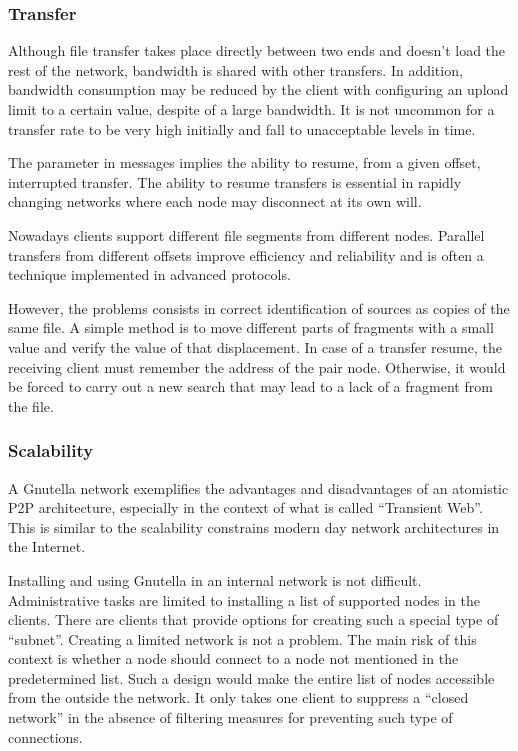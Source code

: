\subsubsection{Transfer}

Although file transfer takes place directly between two ends and doesn't
load the rest of the network, bandwidth is shared with other transfers. In
addition, bandwidth consumption may be reduced by the client with configuring
an upload limit to a certain value, despite of a large bandwidth. It is not
uncommon for a transfer rate to be very high initially and fall to
unacceptable levels in time.

The parameter in messages implies the ability to resume, from a given offset,
interrupted transfer. The ability to resume transfers is essential in rapidly
changing networks where each node may disconnect at its own will.

Nowadays clients support different file segments from different nodes.
Parallel transfers from different offsets improve efficiency and reliability
and is often a technique implemented in advanced protocols.

However, the problems consists in correct identification of sources as copies
of the same file. A simple method is to move different parts of fragments with
a small value and verify the value of that displacement. In case of a transfer
resume, the receiving client must remember the address of the pair node.
Otherwise, it would be forced to carry out a new search that may lead to
a lack of a fragment from the file.

\subsubsection{Scalability}

A Gnutella network exemplifies the advantages and disadvantages of an atomistic
P2P architecture, especially in the context of what is called ``Transient Web''.
This is similar to the scalability constrains modern day network
architectures in the Internet.

Installing and using Gnutella in an internal network is not difficult.
Administrative tasks are limited to installing a list of supported nodes in
the clients. There are clients that provide options for creating such a
special type of ``subnet''. Creating a limited network is not a problem. The
main risk of this context is whether a node should connect to a node not
mentioned in the predetermined list. Such a design would make the entire list
of nodes accessible from the outside the network. It only takes one client to
suppress a ``closed network'' in the absence of filtering measures for
preventing such type of connections.

